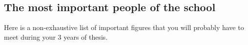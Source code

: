 \subsection{The most important people of the school}
Here is a non-exhaustive list of important figures that you will probably have to meet during your 3 years of thesis.


\newcommand{\largcol}{0.29\textwidth}

\newcommand{\pers}[4]{%
\begin{tabular}{m{\largcol}}%
\ifthenelse{\equal{#1}{}}{\todo{Photo}}{\texttt{[image: images/\#1]}}%
\\ \textbf{#2} \\ \textit{(#3)} \\ #4
\end{tabular}}

